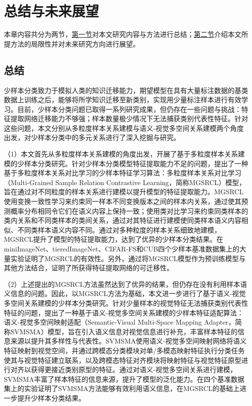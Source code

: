 \chapter[\hspace{0pt}总结与未来展望]{{\heiti{}\hspace{0pt}总结与未来展望}}\label{section 7}
\removelofgap
\removelotgap

本章内容共分为两节，\hyperref[section5: 总结]{第一节}对本文研究内容与方法进行总结；\hyperref[section5: 未来展望]{第二节}介绍本文所提方法的局限性并对未来研究方向进行展望。

\section[\hspace{-2pt}总结]{{\heiti{} \hspace{-8pt}总结}}\label{section5: 总结}

少样本分类致力于模拟人类的知识迁移能力，期望模型在具有大量标注数据的基类数据上训练之后，能够将所学知识迁移至新类别，实现用少量标注样本进行有效学习。目前，少样本分类问题已取得一系列研究成果，但仍存在一些问题与挑战：特征提取网络迁移能力不够强；样本数量极少情况下无法捕获类别代表性特征。针对这些问题，本文分别从多粒度样本关系建模与语义-视觉多空间关系建模两个角度出发，对少样本分类中的多元关系进行了深入挖掘与研究。

（1）本文首先从多粒度样本关系建模的角度出发，开展了基于多粒度样本关系建模的少样本分类研究。针对少样本分类模型特征提取能力不足的问题，提出了一种基于多粒度样本关系对比学习的少样本特征学习算法：多粒度样本关系对比学习（Multi-Grained Sample Relation Contrastive Learning，简称MGSRCL）模型，旨在通过对不同粒度的样本关系进行建模以提升模型的特征提取能力。MGSRCL使用变换一致性学习来约束同一样本不同变换版本之间的样本内关系，通过使其预测概率分布相同令它们在语义内容上保持一致；使用类对比学习来约束同类样本的类内关系和不同类样本的类间关系，通过对其特征进行建模使同类样本语义内容相似、不同类样本语义内容不同。通过对多种粒度的样本关系细致地建模，MGSRCL提升了模型的特征提取能力，达到了优异的少样本分类结果。在miniImageNet、tieredImageNet、CIFAR-FS和CUB四个少样本基准数据集上的大量实验证明了MGSRCL的有效性。另外，通过将MGSRCL模型作为预训练模型与其他方法结合，证明了所获得特征提取网络的可迁移性。

（2）上述提出的MGSRCL方法虽然达到了优异的结果，但仍存在没有利用样本语义信息的问题。因此，以MGSRCL方法为基础，本文进一步进行了基于语义-视觉多空间关系建模的少样本分类研究。针对少量样本的视觉特征无法捕获类别代表性特征的问题，提出了一种基于语义-视觉多空间关系建模的少样本特征适配算法：语义-视觉多空间映射适配（Semantic-Visual Multi-Space Mapping Adapter，简称SVMSMA）模型，旨在引入语义信息对视觉信息进行补充，丰富样本特征的信息来源以提升其多样性与代表性。SVMSMA使用语义-视觉多空间映射网络将语义特征映射到视觉空间，并通过跨模态分类模块对单/多模态映射特征执行分类任务使其与视觉特征建立联系，以及跨模态特征对齐模块将映射特征与视觉特征原型进行对齐以获得更接近类别原型的特征。通过对语义-视觉多空间关系进行建模，SVMSMA丰富了样本特征的信息来源，提升了模型的泛化能力。在四个基准数据集上的实验证明了SVMSMA方法能够有效利用语义信息，在MGSRCL的基础上进一步提升少样本分类结果。

